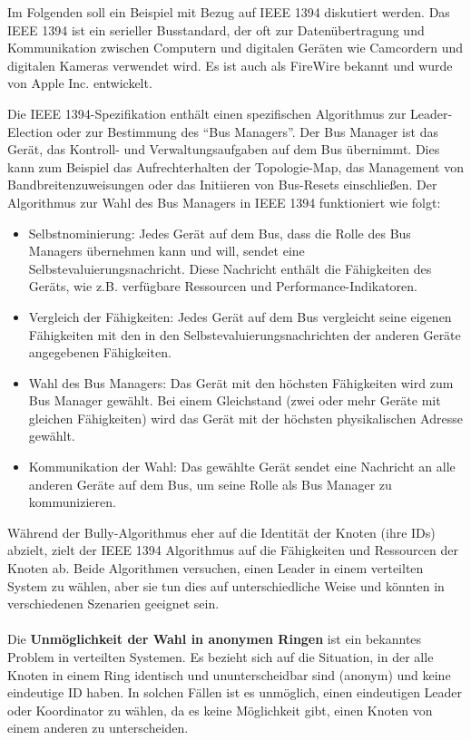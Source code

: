Im Folgenden soll ein Beispiel mit Bezug auf IEEE 1394 diskutiert werden. Das IEEE 1394 ist ein serieller Busstandard, der oft zur Datenübertragung und Kommunikation zwischen Computern und digitalen Geräten wie Camcordern und digitalen Kameras verwendet wird. Es ist auch als FireWire bekannt und wurde von Apple Inc. entwickelt.

Die IEEE 1394-Spezifikation enthält einen spezifischen Algorithmus zur Leader-Election oder zur Bestimmung des \enquote{Bus Managers}. Der Bus Manager ist das Gerät, das Kontroll- und Verwaltungsaufgaben auf dem Bus übernimmt. Dies kann zum Beispiel das Aufrechterhalten der Topologie-Map, das Management von Bandbreitenzuweisungen oder das Initiieren von Bus-Resets einschließen. Der Algorithmus zur Wahl des Bus Managers in IEEE 1394 funktioniert wie folgt:
\begin{itemize}
\item Selbstnominierung: Jedes Gerät auf dem Bus, dass die Rolle des Bus Managers übernehmen kann und will, sendet eine Selbstevaluierungsnachricht. Diese Nachricht enthält die Fähigkeiten des Geräts, wie z.B. verfügbare Ressourcen und Performance-Indikatoren.
\item Vergleich der Fähigkeiten: Jedes Gerät auf dem Bus vergleicht seine eigenen Fähigkeiten mit den in den Selbstevaluierungsnachrichten der anderen Geräte angegebenen Fähigkeiten.
\item Wahl des Bus Managers: Das Gerät mit den höchsten Fähigkeiten wird zum Bus Manager gewählt. Bei einem Gleichstand (zwei oder mehr Geräte mit gleichen Fähigkeiten) wird das Gerät mit der höchsten physikalischen Adresse gewählt.
\item Kommunikation der Wahl: Das gewählte Gerät sendet eine Nachricht an alle anderen Geräte auf dem Bus, um seine Rolle als Bus Manager zu kommunizieren.
\end{itemize}
Während der  Bully-Algorithmus eher auf die Identität der Knoten (ihre IDs) abzielt, zielt der IEEE 1394 Algorithmus auf die Fähigkeiten und Ressourcen der Knoten ab. Beide Algorithmen versuchen, einen Leader in einem verteilten System zu wählen, aber sie tun dies auf unterschiedliche Weise und könnten in verschiedenen Szenarien geeignet sein.
\\\\
Die \textbf{Unmöglichkeit der Wahl in anonymen Ringen} ist ein bekanntes Problem in verteilten Systemen. Es bezieht sich auf die Situation, in der alle Knoten in einem Ring identisch und ununterscheidbar sind (anonym) und keine eindeutige ID haben. In solchen Fällen ist es unmöglich, einen eindeutigen Leader oder Koordinator zu wählen, da es keine Möglichkeit gibt, einen Knoten von einem anderen zu unterscheiden.

